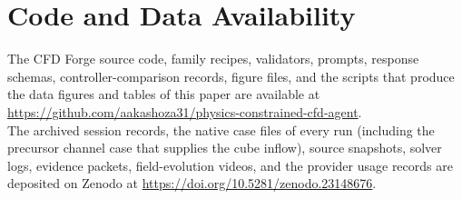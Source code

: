 \documentclass[11pt]{article}
\begin{document}
\section*{Code and Data Availability}
The CFD Forge source code, family recipes, validators, prompts, response
schemas, controller-comparison records, figure files, and the scripts that
produce the data figures and tables of this paper are available at\\
\url{https://github.com/aakashoza31/physics-constrained-cfd-agent}.\\
The archived session records, the native case files of every run (including
the precursor channel case that supplies the cube inflow), source snapshots,
solver logs, evidence packets, field-evolution videos, and the provider usage
records are deposited on Zenodo at
\url{https://doi.org/10.5281/zenodo.23148676}.
\end{document}
